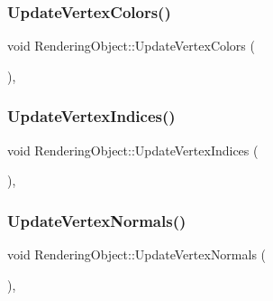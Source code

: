 \hypertarget{class_rendering_object_aca18dbb9252f27cef09df307dbcf02a9}{}\label{class_rendering_object_aca18dbb9252f27cef09df307dbcf02a9} 
\subsubsection{\texorpdfstring{Update\+Vertex\+Colors()}{UpdateVertexColors()}}
{\footnotesize\ttfamily void Rendering\+Object\+::\+Update\+Vertex\+Colors (\begin{DoxyParamCaption}{ }\end{DoxyParamCaption})\hspace{0.3cm}{\ttfamily [protected]}, {\ttfamily [virtual]}}

\hypertarget{class_rendering_object_afb49054121b1b552bce58625db91b851}{}\label{class_rendering_object_afb49054121b1b552bce58625db91b851} 
\subsubsection{\texorpdfstring{Update\+Vertex\+Indices()}{UpdateVertexIndices()}}
{\footnotesize\ttfamily void Rendering\+Object\+::\+Update\+Vertex\+Indices (\begin{DoxyParamCaption}{ }\end{DoxyParamCaption})\hspace{0.3cm}{\ttfamily [protected]}, {\ttfamily [virtual]}}

\hypertarget{class_rendering_object_ae4b537e1c9b1c5c50cb7b0db83e6f190}{}\label{class_rendering_object_ae4b537e1c9b1c5c50cb7b0db83e6f190} 
\subsubsection{\texorpdfstring{Update\+Vertex\+Normals()}{UpdateVertexNormals()}}
{\footnotesize\ttfamily void Rendering\+Object\+::\+Update\+Vertex\+Normals (\begin{DoxyParamCaption}{ }\end{DoxyParamCaption})\hspace{0.3cm}{\ttfamily [protected]}, {\ttfamily [virtual]}}

